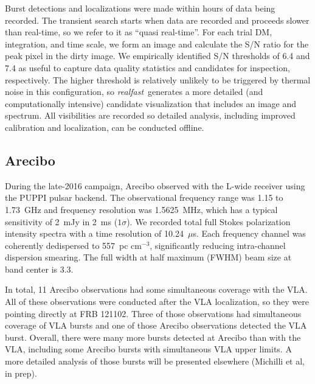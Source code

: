 \documentclass[twocolumn]{aastex61}
\newcommand{\rf}{\emph{realfast}}
\newcommand{\frb}{FRB 121102}
\begin{document}
Burst detections and localizations were made within hours of data being recorded. The transient search starts when data are recorded and proceeds slower than real-time, so we refer to it as ``quasi real-time''. For each trial DM, integration, and time scale, we form an image and calculate the S/N ratio for the peak pixel in the dirty image. We empirically identified S/N thresholds of 6.4 and 7.4 as useful to capture data quality statistics and candidates for inspection, respectively. The higher threshold is relatively unlikely to be triggered by thermal noise in this configuration, so \rf\ generates a more detailed (and computationally intensive) candidate visualization that includes an image and spectrum. All visibilities are recorded so detailed analysis, including improved calibration and localization, can be conducted offline. 

\subsection{Arecibo}

During the late-2016 campaign, Arecibo observed with the L-wide receiver using the PUPPI pulsar backend. The observational frequency range was 1.15 to 1.73~GHz and frequency resolution was 1.5625~MHz, which has a typical sensitivity of 2~mJy in 2~ms ($1\sigma$). We recorded total full Stokes polarization intensity spectra with a time resolution of 10.24~$\mu$s. Each frequency channel was coherently dedispersed to 557~pc cm$^{-3}$, significantly reducing intra-channel dispersion smearing. The full width at half maximum (FWHM) beam size at band center is 3.3\arcmin.

In total, 11 Arecibo observations had some simultaneous coverage with the VLA. All of these observations were conducted after the VLA localization, so they were pointing directly at \frb. Three of those observations had simultaneous coverage of VLA bursts and one of those Arecibo observations detected the VLA burst. 
Overall, there were many more bursts detected at Arecibo than with the VLA, including some Arecibo bursts with simultaneous VLA upper limits. A more detailed analysis of those bursts will be presented elsewhere (Michilli et al, in prep).
\end{document}
